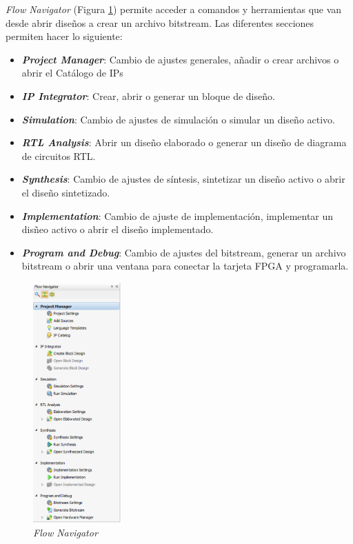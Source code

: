 

\textit{Flow Navigator} (Figura \ref{flownavigator}) permite acceder a comandos y herramientas que van desde abrir diseños a crear un archivo bitstream. Las 
diferentes secciones permiten hacer lo siguiente:
\begin{itemize}
    \item \textit{\textbf{Project Manager}}: Cambio de ajustes generales, añadir o crear archivos o abrir el Catálogo de IPs
    \item \textit{\textbf{IP Integrator}}: Crear, abrir o generar un bloque de diseño. 
    \item \textit{\textbf{Simulation}}: Cambio de ajustes de simulación o simular un diseño activo.
    \item \textit{\textbf{RTL Analysis}}: Abrir un diseño elaborado o generar un diseño de diagrama de circuitos RTL.
    \item \textit{\textbf{Synthesis}}: Cambio de ajustes de síntesis, sintetizar un diseño activo o abrir el diseño sintetizado.
    \item \textit{\textbf{Implementation}}: Cambio de ajuste de implementación, implementar un disñeo activo o abrir el diseño implementado.
    \item \textit{\textbf{Program and Debug}}: Cambio de ajustes del bitstream, generar un archivo bitstream o abrir una ventana para 
    conectar la tarjeta FPGA y programarla.
\end{itemize}

\begin{figure}[H]
    \centering
    \includegraphics[width = 0.3\textwidth]{imagenes/flownavigator.png}
    \caption{\textit{Flow Navigator}}\label{flownavigator}
\end{figure}

